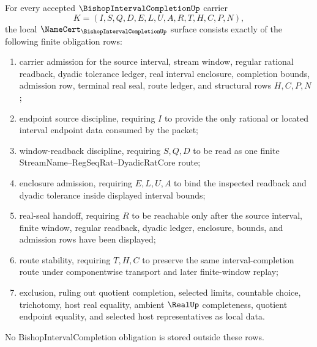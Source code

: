 \begin{theorem}
\label{thm:bishop-interval-completion-obligations}
For every accepted $\BishopIntervalCompletionUp$ carrier
$$
K=(I,S,Q,D,E,L,U,A,R,T,H,C,P,N),
$$
the local $\NameCert_{\BishopIntervalCompletionUp}$ surface consists exactly of the following finite obligation rows:
\begin{enumerate}
\item carrier admission for the source interval, stream window, regular rational readback, dyadic tolerance ledger, real interval enclosure, completion bounds, admission row, terminal real seal, route ledger, and structural rows $H,C,P,N$;
\item endpoint source discipline, requiring $I$ to provide the only rational or located interval endpoint data consumed by the packet;
\item window-readback discipline, requiring $S,Q,D$ to be read as one finite StreamName--RegSeqRat--DyadicRatCore route;
\item enclosure admission, requiring $E,L,U,A$ to bind the inspected readback and dyadic tolerance inside displayed interval bounds;
\item real-seal handoff, requiring $R$ to be reachable only after the source interval, finite window, regular readback, dyadic ledger, enclosure, bounds, and admission rows have been displayed;
\item route stability, requiring $T,H,C$ to preserve the same interval-completion route under componentwise transport and later finite-window replay;
\item exclusion, ruling out quotient completion, selected limits, countable choice, trichotomy, host real equality, ambient $\RealUp$ completeness, quotient endpoint equality, and selected host representatives as local data.
\end{enumerate}
No BishopIntervalCompletion obligation is stored outside these rows.
\end{theorem}
